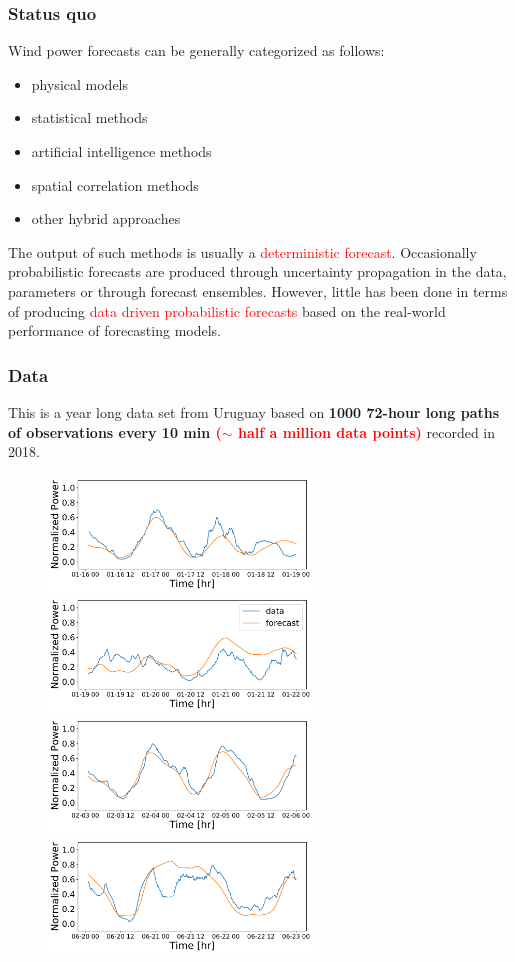 \documentclass[aspectratio=169]{beamer}\usepackage[utf8]{inputenc}
\begin{document}
\begin{frame}\frametitle{Status quo }
  Wind power forecasts can be generally categorized as follows:
  \begin{itemize}
    \item physical models
    \item statistical methods
    \item artificial intelligence methods
    \item spatial correlation methods
    \item other hybrid approaches
  \end{itemize}
 The output of such methods is usually a \textcolor{red}{deterministic forecast}. Occasionally probabilistic forecasts are produced through uncertainty propagation in the data, parameters or through forecast ensembles. However, little has been done in terms of producing \textcolor{red}{data driven probabilistic forecasts} based on the real-world performance of forecasting models.
\end{frame}

\begin{frame}\frametitle{Data}
This is a year long data set from Uruguay based on \textbf{1000 72-hour long paths of observations every 10 min \textcolor{red}{ ($\sim$ half a million data points)}} recorded in 2018.
\begin{figure}
  \includegraphics[width=70mm,scale=1]{plots/data_1516064400.pdf}
  \includegraphics[width=70mm,scale=1]{plots/data_1516323600.pdf}\\
  \includegraphics[width=70mm,scale=1]{plots/data_1517619600.pdf}
  \includegraphics[width=70mm,scale=1]{plots/data_1529456400.pdf}
\end{figure}
\end{frame}
\end{document}
